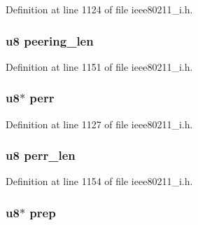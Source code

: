 Definition at line 1124 of file ieee80211\-\_\-i.\-h.

\hypertarget{structieee802__11__elems_a4ee92ca9513f9ef27a1609135452129b}{
\subsubsection[{peering\-\_\-len}]{\setlength{\rightskip}{0pt plus 5cm}u8 peering\-\_\-len}}\label{structieee802__11__elems_a4ee92ca9513f9ef27a1609135452129b}


Definition at line 1151 of file ieee80211\-\_\-i.\-h.

\hypertarget{structieee802__11__elems_ab2dad797baa297bd9525977b074bcaa4}{
\subsubsection[{perr}]{\setlength{\rightskip}{0pt plus 5cm}u8$\ast$ perr}}\label{structieee802__11__elems_ab2dad797baa297bd9525977b074bcaa4}


Definition at line 1127 of file ieee80211\-\_\-i.\-h.

\hypertarget{structieee802__11__elems_a29835ac7646e7afef597ea41654ff3a9}{
\subsubsection[{perr\-\_\-len}]{\setlength{\rightskip}{0pt plus 5cm}u8 perr\-\_\-len}}\label{structieee802__11__elems_a29835ac7646e7afef597ea41654ff3a9}


Definition at line 1154 of file ieee80211\-\_\-i.\-h.

\hypertarget{structieee802__11__elems_afce540ba301085452d9683d7c08587ae}{
\subsubsection[{prep}]{\setlength{\rightskip}{0pt plus 5cm}u8$\ast$ prep}}\label{structieee802__11__elems_afce540ba301085452d9683d7c08587ae}



